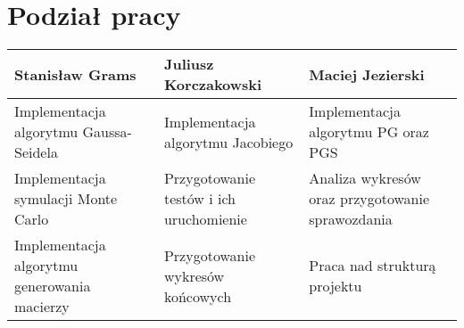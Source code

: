 \section{Podział pracy}
\centering
	\begin{tabular}{| p{5cm} | p{5cm} | p{5cm} |}
		\hline
		\textbf{Stanisław Grams} & \textbf{Juliusz Korczakowski} & \textbf{Maciej Jezierski} \\ \hline
		Implementacja algorytmu Gaussa-Seidela& Implementacja algorytmu Jacobiego & Implementacja algorytmu PG oraz PGS  \\ \hline
		 Implementacja symulacji Monte Carlo& Przygotowanie testów i ich uruchomienie &Analiza wykresów oraz przygotowanie sprawozdania \\ \hline
		Implementacja algorytmu generowania macierzy & Przygotowanie wykresów końcowych &Praca nad strukturą projektu\\ \hline
	\end{tabular}


